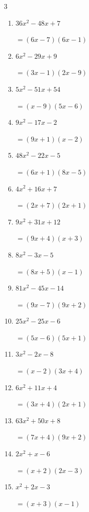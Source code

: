 \begin{multicols}{3}
\begin{enumerate}
        $=(8x+7)(7x+3)$

  \item $36x^{2}-48x+7$

        $=(6x-7)(6x-1)$

  \item $6x^{2}-29x+9$

        $=(3x-1)(2x-9)$

  \item $5x^{2}-51x+54$

        $=(x-9)(5x-6)$

  \item $9x^{2}-17x-2$

        $=(9x+1)(x-2)$

  \item $48x^{2}-22x-5$

        $=(6x+1)(8x-5)$

\columnbreak %

  \item $4x^{2}+16x+7$

        $=(2x+7)(2x+1)$

  \item $9x^{2}+31x+12$

        $=(9x+4)(x+3)$

  \item $8x^{2}-3x-5$

        $=(8x+5)(x-1)$

  \item $81x^{2}-45x-14$

        $=(9x-7)(9x+2)$

  \item $25x^{2}-25x-6$

        $=(5x-6)(5x+1)$

  \item $3x^{2}-2x-8$

        $=(x-2)(3x+4)$

  \item $6x^{2}+11x+4$

        $=(3x+4)(2x+1)$

  \item $63x^{2}+50x+8$

        $=(7x+4)(9x+2)$

  \item $2x^{2}+x-6$

        $=(x+2)(2x-3)$

  \item $x^{2}+2x-3$

        $=(x+3)(x-1)$


\end{enumerate}
\end{multicols}
